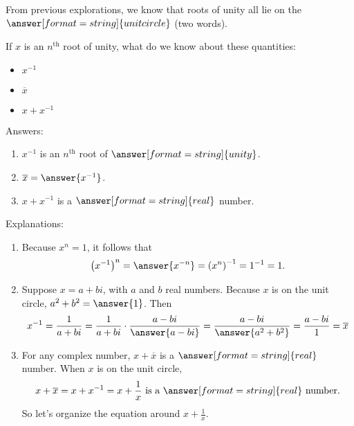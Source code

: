 \documentclass[space,nooutcomes]{ximera}
\begin{document}
\begin{problem}
From previous explorations, we know that roots of unity all lie on the $\answer[format=string]{unit circle}$ (two words). 

If $x$ is an $n^\text{th}$ root of unity, what do we know about these quantities: 
\begin{itemize}
\item $x^{-1}$ 
\item $\overline{x}$
\item $x+x^{-1}$
\end{itemize}

Answers:
\begin{enumerate}
\item $x^{-1}$ is an $n^\text{th}$ root of $\answer[format=string]{unity}$.  
\item $\overline{x} = \answer{x^{-1}}$. 
\item $x+x^{-1}$ is a $\answer[format=string]{real}$ number.  
\end{enumerate}
\begin{problem}
Explanations: 
\begin{enumerate}
\item Because $x^n=1$, it follows that 
\[
\left(x^{-1}\right)^n = \answer{x^{-n}} = \left(x^n\right)^{-1} = 1^{-1} = 1. 
\]
\item Suppose $x=a+bi$, with $a$ and $b$ real numbers. Because $x$ is on the unit circle, $a^2+b^2 = \answer{1}$.  Then 
\[
x^{-1}=\frac{1}{a+bi}=\frac{1}{a+bi}\cdot\frac{a-bi}{\answer{a-bi}}=\frac{a-bi}{\answer{a^2+b^2}}=\frac{a-bi}{1}=\overline{x}
\]
\item For any complex number, $x+\overline{x}$ is a $\answer[format=string]{real}$ number.  When $x$ is on the unit circle, 
\[
x + \overline{x} = x + x^{-1} = x + \frac{1}{x}\text{ is a }\answer[format=string]{real}\text{ number.}
\]
So let's organize the equation around $x + \frac{1}{x}$.  
\end{enumerate}
\end{problem}
\end{problem}
\end{document}
